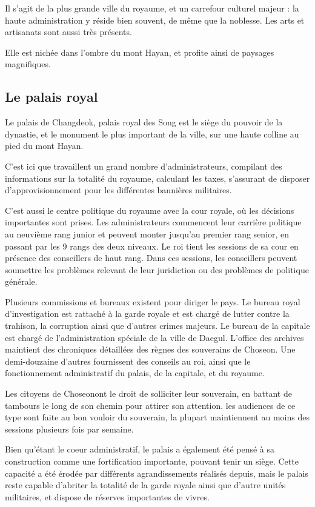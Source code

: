 \documentclass[10pt,a4paper]{book}
\newcommand{\nomroyaume}{Choseon}
\begin{document}
Il s'agit de la plus grande ville du royaume, et un carrefour culturel majeur : la haute administration y réside bien souvent, de même que la noblesse. Les arts et artisanats sont aussi très présents.

Elle est nichée dans l'ombre du mont Hayan, et profite ainsi de paysages magnifiques.
\subsection{Le palais royal}
Le palais de Changdeok, palais royal des Song est le siège du pouvoir de la dynastie, et le monument le plus important de la ville, sur une haute colline au pied du mont Hayan. 

C'est ici que travaillent un grand nombre d'administrateurs, compilant des informations sur la totalité du royaume, calculant les taxes, s'assurant de disposer d'approvisionnement pour les différentes bannières militaires.

C'est aussi le centre politique du royaume avec la cour royale, où les décisions importantes sont prises. Les administrateurs commencent leur carrière politique au neuvième rang junior et peuvent monter jusqu'au premier rang senior, en passant par les 9 rangs des deux niveaux. Le roi tient les sessions de sa cour en présence des conseillers de haut rang. Dans ces sessions, les conseillers peuvent soumettre les problèmes relevant de leur juridiction ou des problèmes de politique générale.

Plusieurs commissions et bureaux existent pour diriger le pays. Le bureau royal d'investigation est rattaché à la garde royale et est chargé de lutter contre la trahison, la corruption ainsi que d'autres crimes majeurs. Le bureau de la capitale est chargé de l'administration spéciale de la ville de Daegul. L'office des archives maintient des chroniques détaillées des règnes des souverains de \nomroyaume. Une demi-douzaine d'autres fournissent des conseils au roi, ainsi que le fonctionnement administratif du palais, de la capitale, et du royaume.

Les citoyens de \nomroyaume ont le droit de solliciter leur souverain, en battant de tambours le long de son chemin pour attirer son attention. les audiences de ce type sont faite au bon vouloir du souverain, la plupart maintiennent au moins des sessions plusieurs fois par semaine.

Bien qu'étant le coeur administratif, le palais a également été pensé à sa construction comme une fortification importante, pouvant tenir un siège. Cette capacité a été érodée par différents agrandissements réalisés depuis, mais le palais reste capable d'abriter la totalité de la garde royale ainsi que d'autre unités militaires, et dispose de réserves importantes de vivres.
\end{document}
